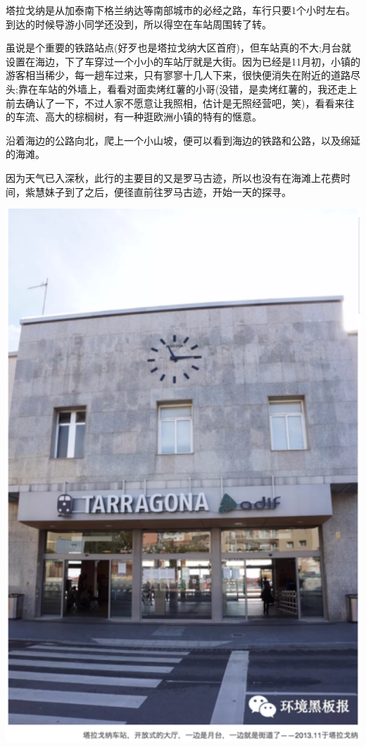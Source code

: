 \documentclass[
]{book}
\begin{document}
塔拉戈纳是从加泰南下格兰纳达等南部城市的必经之路，车行只要1个小时左右。到达的时候导游小同学还没到，所以得空在车站周围转了转。

虽说是个重要的铁路站点(好歹也是塔拉戈纳大区首府)，但车站真的不大;月台就设置在海边，下了车穿过一个小小的车站厅就是大街。因为已经是11月初，小镇的游客相当稀少，每一趟车过来，只有寥寥十几人下来，很快便消失在附近的道路尽头;靠在车站的外墙上，看看对面卖烤红薯的小哥(没错，是卖烤红薯的，我还走上前去确认了一下，不过人家不愿意让我照相，估计是无照经营吧，笑)，看看来往的车流、高大的棕榈树，有一种逛欧洲小镇的特有的惬意。

沿着海边的公路向北，爬上一个小山坡，便可以看到海边的铁路和公路，以及绵延的海滩。

因为天气已入深秋，此行的主要目的又是罗马古迹，所以也没有在海滩上花费时间，紫慧妹子到了之后，便径直前往罗马古迹，开始一天的探寻。

\includegraphics[width=5.56in]{images/xt25}
\end{document}

